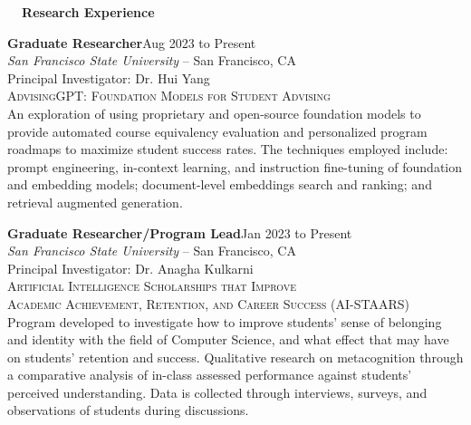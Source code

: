 \documentclass[hidelinks, 10pt]{article}
\begin{document}
{\vspace{7mm}
{\centering


    {\fontsize{14}{14}\selectfont \textbf{\ \ Research Experience\ \ }}\hrulefill

    \vspace{5mm}

    \begin{minipage}[ct]{0.9\linewidth}
        \textbf{Graduate Researcher}\hfill Aug 2023 to Present\\
        \emph{San Francisco State University} -- San Francisco, CA\\
        Principal Investigator: Dr. Hui Yang\\
        {\textsc{AdvisingGPT: Foundation Models for Student Advising}}
        \vspace{1mm}\\
        An exploration of using proprietary and open-source foundation models to provide automated course equivalency evaluation and
        personalized program roadmaps to maximize student success rates. The techniques employed include: prompt engineering, in-context
        learning, and instruction fine-tuning of foundation and embedding models; document-level embeddings search and ranking; and
        retrieval augmented generation.
    \end{minipage}

    \vspace{4mm}

    \begin{minipage}[ct]{0.9\linewidth}
        \textbf{Graduate Researcher/Program Lead}\hfill Jan 2023 to Present\\
        \emph{San Francisco State University} -- San Francisco, CA\\
        Principal Investigator: Dr. Anagha Kulkarni\\
        {\textsc{Artificial Intelligence Scholarships that Improve \\Academic Achievement, Retention, and Career Success (AI-STAARS)}}
        \vspace{1mm}\\
        Program developed to investigate how to improve students' sense of belonging and identity with the field of Computer Science,
        and what effect that may have on students' retention and success.  Qualitative research on metacognition through a comparative
        analysis of in-class assessed performance against students' perceived understanding.  Data is collected through interviews, surveys,
        and observations of students during discussions.
    \end{minipage}

}}
\end{document}
